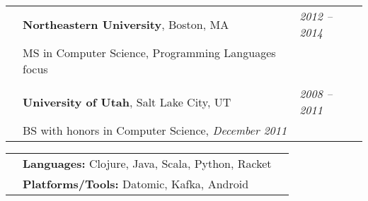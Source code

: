 \documentclass[10pt]{article}
\makeatletter
\newcommand{\category}[2]{
\begin{center}
\vskip 6pt
\begin{tabular*}{\textwidth}{@{}p{0.75in}@{\quad\;\;}p{4in}@{\quad\quad}p{0.7in}}
\vcrush[t]{1in}{\textsc{#1}} &
#2
\end{tabular*}
\end{center}
}
\newcommand{\n}{\\ & }
\newcommand{\DT}[1]{&\hspace{\stretch 1}\textit{#1}}
\newcommand{\conf}[1]{&\hspace{\stretch 1}\crushr{\textit{#1}}}
\newcommand{\citem}{~$\diamond$~}
\newcommand{\ed}[1]{}
\makeatother
\begin{document}
\category{Education}{
  {\bf Northeastern University}, Boston, MA \DT{\ed{September }2012 -- \ed{December }2014}\n
  MS in Computer Science, Programming Languages focus\n
  \n
{\bf University of Utah}, Salt Lake City, UT \DT{\ed{August }2008 -- \ed{December }2011}\n
BS with honors in Computer Science, \emph{December 2011}
}


\category{Technical Skills}{
  {\bf Languages:} Clojure, Java, Scala, Python, Racket \n
  {\bf Platforms/Tools:} Datomic, Kafka, Android
}


\end{document}
